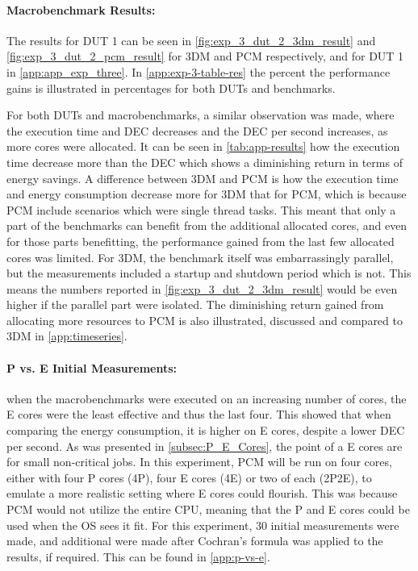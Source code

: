 \paragraph*{Macrobenchmark Results:} The results for DUT 1 can be seen in \cref{fig:exp_3_dut_2_3dm_result} and \cref{fig:exp_3_dut_2_pcm_result} for 3DM and PCM respectively, and for DUT 1 in \cref{app:app_exp_three}. In \cref{app:exp-3-table-res} the percent the performance gains is illustrated in percentages for both DUTs and benchmarks. 



For both DUTs and macrobenchmarks, a similar observation was made, where the execution time and DEC decreases and the DEC per second increases, as more cores were allocated. It can be seen in \cref{tab:app-results} how the execution time decrease more than the DEC which shows a diminishing return in terms of energy savings. A difference between 3DM and PCM is how the execution time and energy consumption decrease more for 3DM that for PCM, which is because PCM include scenarios which were single thread tasks. This meant that only a part of the benchmarks can benefit from the additional allocated cores, and even for those parts benefitting, the performance gained from the last few allocated cores was limited. For 3DM, the benchmark itself was embarrassingly parallel, but the measurements included a startup and shutdown period which is not. This means the numbers reported in \cref{fig:exp_3_dut_2_3dm_result} would be even higher if the parallel part were isolated. The diminishing return gained from allocating more resources to PCM is also illustrated, discussed and compared to 3DM in \cref{app:timeseries}.


\paragraph{P vs. E Initial Measurements:} when the macrobenchmarks were executed on an increasing number of cores, the E cores were the least effective and thus the last four. This showed that when comparing the energy consumption, it is higher on E cores, despite a lower DEC per second. As was presented in \cref{subsec:P_E_Cores}, the point of a E cores are for small non-critical jobs. In this experiment, PCM will be run on four cores, either with four P cores (4P), four E cores (4E) or two of each (2P2E), to emulate a more realistic setting where E cores could flourish. This was because PCM would not utilize the entire CPU, meaning that the P and E cores could be used when the OS sees it fit. For this experiment, $30$ initial measurements were made, and additional were made after Cochran's formula was applied to the results, if required. This can be found in \cref{app:p-vs-e}.


